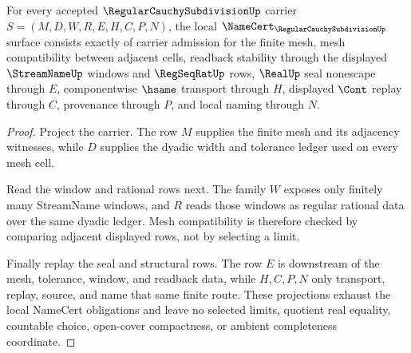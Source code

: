 \begin{theorem}
\label{thm:regular-cauchy-subdivision-namecert-obligations}
For every accepted $\RegularCauchySubdivisionUp$ carrier $S=(M,D,W,R,E,H,C,P,N)$, the local $\NameCert_{\RegularCauchySubdivisionUp}$ surface consists exactly of carrier admission for the finite mesh, mesh compatibility between adjacent cells, readback stability through the displayed $\StreamNameUp$ windows and $\RegSeqRatUp$ rows, $\RealUp$ seal nonescape through $E$, componentwise $\hsame$ transport through $H$, displayed $\Cont$ replay through $C$, provenance through $P$, and local naming through $N$.
\end{theorem}
\begin{proof}
Project the carrier. The row $M$ supplies the finite mesh and its adjacency witnesses, while $D$ supplies the dyadic width and tolerance ledger used on every mesh cell.

Read the window and rational rows next. The family $W$ exposes only finitely many StreamName windows, and $R$ reads those windows as regular rational data over the same dyadic ledger. Mesh compatibility is therefore checked by comparing adjacent displayed rows, not by selecting a limit.

Finally replay the seal and structural rows. The row $E$ is downstream of the mesh, tolerance, window, and readback data, while $H,C,P,N$ only transport, replay, source, and name that same finite route. These projections exhaust the local NameCert obligations and leave no selected limits, quotient real equality, countable choice, open-cover compactness, or ambient completeness coordinate.
\end{proof}

